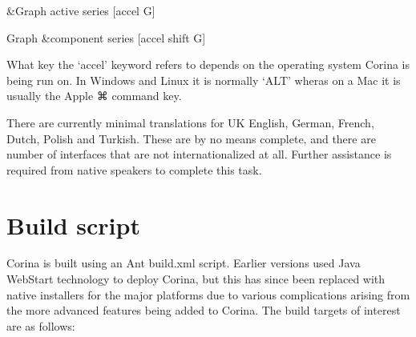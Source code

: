 \begin{itemize*}
 \item {\&}Graph active series [accel G]
 \item Graph {\&}component series [accel shift G]
\end{itemize*}

What key the `accel' keyword refers to depends on the operating system Corina is being run on.  In Windows and Linux it is normally `ALT' wheras on a Mac it is usually the Apple ⌘ command key. 


There are currently minimal translations for UK English, German, French, Dutch, Polish and Turkish.  These are by no means complete, and there are number of interfaces that are not internationalized at all.  Further assistance is required from native speakers to complete this task.

\section{Build script}
\label{txt:buildScript}
Corina is built using an Ant build.xml script.  Earlier versions used Java WebStart technology to deploy Corina, but this has since been replaced with native installers for the major platforms due to various complications arising from the more advanced features being added to Corina.  The build targets of interest are as follows:

